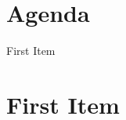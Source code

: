 \documentclass[11pt]{meetingmins}
\begin{document}
\maketitle

\section{Agenda}
\begin{hiddenitems}
	\item First Item
\end{hiddenitems}

\section{First Item}
\end{document}
